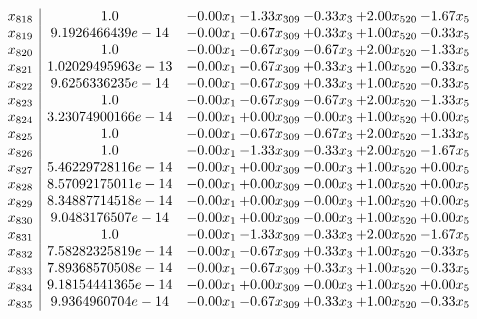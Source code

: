 \documentclass[8pt]{article}
\begin{document}
\[\begin{array}{c| c c@{\hskip 2pt} c@{\hskip 2pt} c@{\hskip 2pt} c@{\hskip 2pt} c@{\hskip 2pt} }
 x_{818}   &  1.0 & -0.00 x_{1} & -1.33 x_{309} & -0.33 x_{3} & +  2.00 x_{520} & -1.67 x_{5}\\
 x_{819}   &  9.1926466439e-14 & -0.00 x_{1} & -0.67 x_{309} & +  0.33 x_{3} & +  1.00 x_{520} & -0.33 x_{5}\\
 x_{820}   &  1.0 & -0.00 x_{1} & -0.67 x_{309} & -0.67 x_{3} & +  2.00 x_{520} & -1.33 x_{5}\\
 x_{821}   &  1.02029495963e-13 & -0.00 x_{1} & -0.67 x_{309} & +  0.33 x_{3} & +  1.00 x_{520} & -0.33 x_{5}\\
 x_{822}   &  9.6256336235e-14 & -0.00 x_{1} & -0.67 x_{309} & +  0.33 x_{3} & +  1.00 x_{520} & -0.33 x_{5}\\
 x_{823}   &  1.0 & -0.00 x_{1} & -0.67 x_{309} & -0.67 x_{3} & +  2.00 x_{520} & -1.33 x_{5}\\
 x_{824}   &  3.23074900166e-14 & -0.00 x_{1} & +  0.00 x_{309} & -0.00 x_{3} & +  1.00 x_{520} & +  0.00 x_{5}\\
 x_{825}   &  1.0 & -0.00 x_{1} & -0.67 x_{309} & -0.67 x_{3} & +  2.00 x_{520} & -1.33 x_{5}\\
 x_{826}   &  1.0 & -0.00 x_{1} & -1.33 x_{309} & -0.33 x_{3} & +  2.00 x_{520} & -1.67 x_{5}\\
 x_{827}   &  5.46229728116e-14 & -0.00 x_{1} & +  0.00 x_{309} & -0.00 x_{3} & +  1.00 x_{520} & +  0.00 x_{5}\\
 x_{828}   &  8.57092175011e-14 & -0.00 x_{1} & +  0.00 x_{309} & -0.00 x_{3} & +  1.00 x_{520} & +  0.00 x_{5}\\
 x_{829}   &  8.34887714518e-14 & -0.00 x_{1} & +  0.00 x_{309} & -0.00 x_{3} & +  1.00 x_{520} & +  0.00 x_{5}\\
 x_{830}   &  9.0483176507e-14 & -0.00 x_{1} & +  0.00 x_{309} & -0.00 x_{3} & +  1.00 x_{520} & +  0.00 x_{5}\\
 x_{831}   &  1.0 & -0.00 x_{1} & -1.33 x_{309} & -0.33 x_{3} & +  2.00 x_{520} & -1.67 x_{5}\\
 x_{832}   &  7.58282325819e-14 & -0.00 x_{1} & -0.67 x_{309} & +  0.33 x_{3} & +  1.00 x_{520} & -0.33 x_{5}\\
 x_{833}   &  7.89368570508e-14 & -0.00 x_{1} & -0.67 x_{309} & +  0.33 x_{3} & +  1.00 x_{520} & -0.33 x_{5}\\
 x_{834}   &  9.18154441365e-14 & -0.00 x_{1} & +  0.00 x_{309} & -0.00 x_{3} & +  1.00 x_{520} & +  0.00 x_{5}\\
 x_{835}   &  9.9364960704e-14 & -0.00 x_{1} & -0.67 x_{309} & +  0.33 x_{3} & +  1.00 x_{520} & -0.33 x_{5}\\

\end{array}\]
\end{document}
